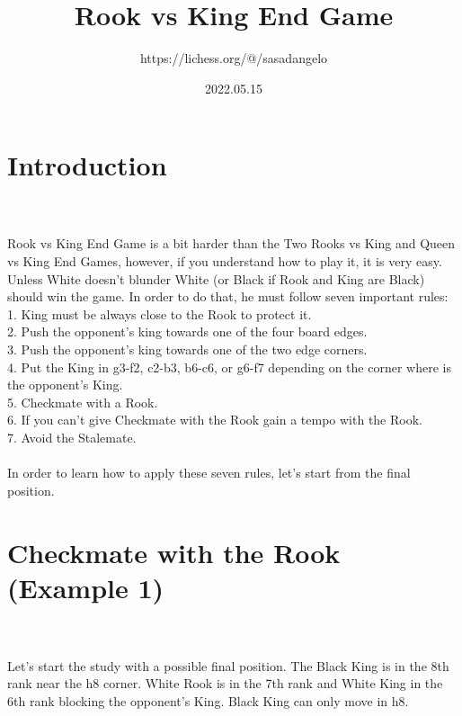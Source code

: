 \documentclass{article}
\title{Rook vs King End Game}
\author{https://lichess.org/@/sasadangelo}
\date{2022.05.15}
\begin{document}
\begin{titlepage}
\maketitle
\end{titlepage}
\section{ Introduction}

\\
\\
Rook vs King End Game is a bit harder than the Two Rooks vs King and Queen vs King End Games, however, if you understand how to play it, it is very easy. Unless White doesn't blunder White (or Black if Rook and King are Black) should win the game. In order to do that, he must follow seven important rules:\\1. King must be always close to the Rook to protect it.\\2. Push the opponent's king towards one of the four board edges.\\3. Push the opponent's king towards one of the two edge corners.\\4. Put the King in g3-f2, c2-b3, b6-c6, or g6-f7 depending on the corner where is the opponent's King.\\5. Checkmate with a Rook.\\6. If you can't give Checkmate with the Rook gain a tempo with the Rook.\\7. Avoid the Stalemate.\\\\In order to learn how to apply these seven rules, let's start from the final position.\section{ Checkmate with the Rook (Example 1)}

\\
\\
Let's start the study with a possible final position. The Black King is in the 8th rank near the h8 corner. White Rook is in the 7th rank and White King in the 6th rank blocking the opponent's King. Black King can only move in h8.\\
\\

\\
\end{document}
